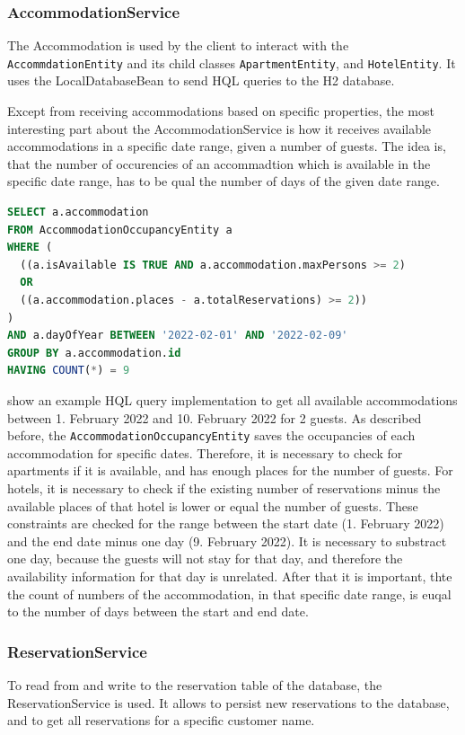 \subsubsection{AccommodationService}
The Accommodation is used by the client to interact with the \texttt{AccommdationEntity} and its child classes \texttt{ApartmentEntity}, and \texttt{HotelEntity}. It uses the LocalDatabaseBean to send HQL queries to the H2 database.

Except from receiving accommodations based on specific properties, the most interesting part about the AccommodationService is how it receives available accommodations in a specific date range, given a number of guests.
The idea is, that the number of occurencies of an accommadtion which is available in the specific date range, has to be qual the number of days of the given date range.
\begin{lstlisting}[label=lst:02_impl_ejb_accommodation_sql, caption=Example of a HQL query to receive all available accommodations, language=sql]
SELECT a.accommodation
FROM AccommodationOccupancyEntity a
WHERE (
  ((a.isAvailable IS TRUE AND a.accommodation.maxPersons >= 2) 
  OR 
  ((a.accommodation.places - a.totalReservations) >= 2))
)
AND a.dayOfYear BETWEEN '2022-02-01' AND '2022-02-09'
GROUP BY a.accommodation.id
HAVING COUNT(*) = 9 
\end{lstlisting}
 show an example HQL query implementation to get all available accommodations between 1. February 2022 and 10. February 2022 for 2 guests.
As described before, the \texttt{AccommodationOccupancyEntity} saves the occupancies of each accommodation for specific dates. Therefore, it is necessary to check for apartments if it is available, and has enough places for the number of guests. For hotels, it is necessary to check if the existing number of reservations minus the available places of that hotel is lower or equal the number of guests.
These constraints are checked for the range between the start date (1. February 2022) and the end date minus one day (9. February 2022). It is necessary to substract one day, because the guests will not stay for that day, and therefore the availability information for that day is unrelated.
After that it is important, thte the count of numbers of the accommodation, in that specific date range, is euqal to the number of days between the start and end date.


\subsubsection{ReservationService}
To read from and write to the reservation table of the database, the ReservationService is used. It allows to persist new reservations to the database, and to get all reservations for a specific customer name.

